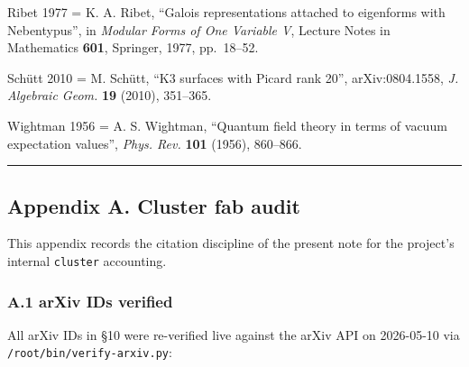 \documentclass[
  11pt,
  a4paper,
]{amsart}
\begin{document}
Ribet 1977 = K. A. Ribet, ``Galois representations attached to eigenforms with Nebentypus'', in \emph{Modular Forms of One Variable V}, Lecture Notes in Mathematics \textbf{601}, Springer, 1977, pp.~18--52.

Schütt 2010 = M. Schütt, ``K3 surfaces with Picard rank 20'', arXiv:0804.1558, \emph{J. Algebraic Geom.} \textbf{19} (2010), 351--365.

Wightman 1956 = A. S. Wightman, ``Quantum field theory in terms of vacuum expectation values'', \emph{Phys. Rev.} \textbf{101} (1956), 860--866.

\begin{center}\rule{0.5\linewidth}{0.5pt}\end{center}

\hypertarget{appendix-a.-cluster-fab-audit}{%
\subsection{Appendix A. Cluster fab audit}\label{appendix-a.-cluster-fab-audit}}

This appendix records the citation discipline of the present note for the project's internal \texttt{cluster} accounting.

\hypertarget{a.1-arxiv-ids-verified}{%
\subsubsection{A.1 arXiv IDs verified}\label{a.1-arxiv-ids-verified}}

All arXiv IDs in §10 were re-verified live against the arXiv API on 2026-05-10 via \texttt{/root/bin/verify-arxiv.py}:
\end{document}
